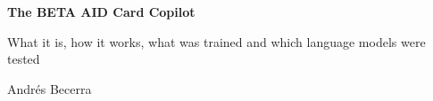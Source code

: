 \documentclass[paper=a4,fontsize=11pt,parskip=half-,headings=standardclasses]{scrartcl}
\begin{document}
\begin{center}
  {\LARGE\bfseries The BETA AID Card Copilot\par}
  \vspace{0.4em}
  {\large What it is, how it works, what was trained and which language models were tested\par}
  \vspace{0.8em}
  {Andrés Becerra \quad\textperiodcentered\quad \reportdate\par}
\end{center}
\vspace{0.5em}








\printbibliography[heading=bibintoc]
\end{document}
